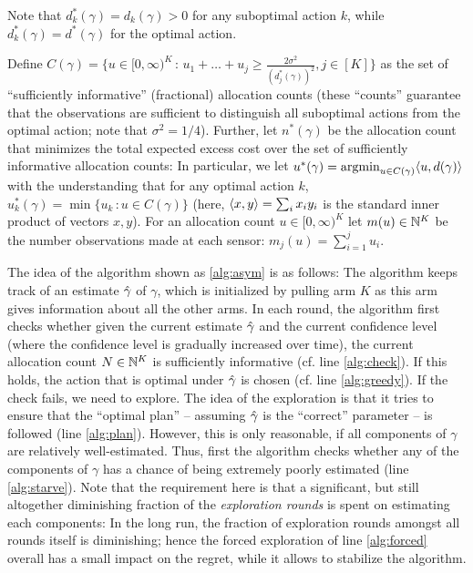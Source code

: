 Note that $d_k^*(\gamma) = d_k(\gamma)>0$ for any suboptimal
action $k$, while $d_k^*(\gamma) = d^*(\gamma)$ for the optimal action.

Define $C(\gamma) = \{ u\in [0,\infty)^K\,:\, u_1 + \dots + u_j \ge \frac{2\sigma^2}{(d_j^*(\gamma))^2}, j\in [K] \}$
as the set of ``sufficiently informative'' (fractional)  allocation counts 
(these ``counts'' guarantee that the observations are sufficient to distinguish all suboptimal actions from the optimal action; note that $\sigma^2=1/4$).
Further, let $n^*(\gamma)$
be the allocation count that minimizes the total expected excess cost over the set of sufficiently informative allocation counts:
In particular,  we let $u^*(\gamma) = \operatorname{argmin}_{u\in C(\gamma)} \langle  u, d(\gamma)  \rangle$ 
with the understanding that for any optimal action $k$, $u_k^*(\gamma) = \min \{ u_k \,: u\in C(\gamma) \}$ (here, $\langle x,y \rangle = \sum_i x_i y_i$ is the standard inner product of vectors $x,y$).
For an allocation count $u\in [0,\infty)^K$ let $m(u)\in \mathbb{N}^K$ be the number observations made at each sensor:
$m_j(u) = \sum_{i=1}^j u_i$.

The idea of the algorithm shown as \cref{alg:asym} is as follows:
The algorithm keeps track of an estimate $\hat{\gamma}$ of $\gamma$, which is initialized by pulling arm $K$ as this arm
gives information about all the other arms.
In each round, the algorithm first checks whether given the current estimate $\hat{\gamma}$ and the current confidence level (where the confidence level is gradually increased over time), the current allocation count $N\in \mathbb{N}^K$
is sufficiently informative (cf. line \ref{alg:check}). If this holds, the action that is optimal under $\hat{\gamma}$ is chosen 
(cf. line \ref{alg:greedy}). If the check fails, we need to explore.
The idea of the exploration is that it tries to ensure that the ``optimal plan'' -- assuming $\hat{\gamma}$ is the ``correct'' parameter -- is followed (line \ref{alg:plan}). However, this is only reasonable, if all components of $\gamma$ are relatively well-estimated.
Thus, first the algorithm checks whether any of the components of $\gamma$ has a chance of being
extremely poorly estimated (line \ref{alg:starve}). Note that the requirement here is that a significant, but still altogether diminishing fraction of the \emph{exploration rounds} is spent on estimating each components: In the long run, the fraction of exploration rounds amongst all rounds itself is diminishing; hence the forced exploration of line \ref{alg:forced} overall has a small impact on the regret, while it allows to stabilize the algorithm.

